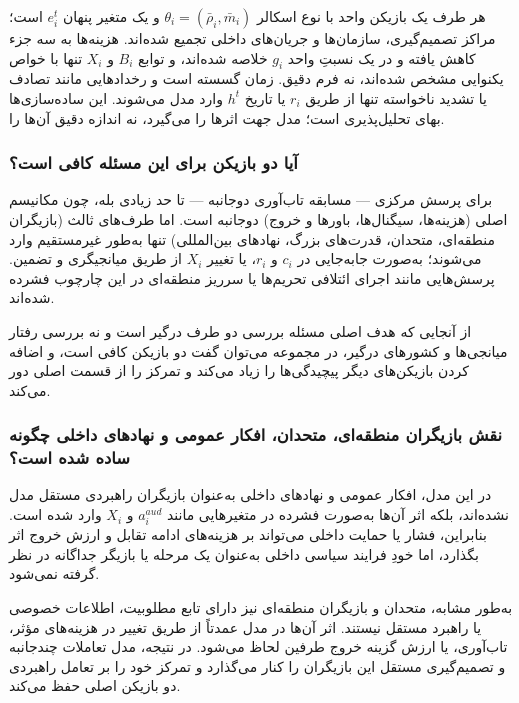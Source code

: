 \documentclass[12pt]{article}
\begin{document}
هر طرف یک بازیکن واحد با نوع اسکالر $\theta_i = (\bar{\rho}_i,\bar{m}_i)$
و یک متغیر پنهان $e_i^t$ است؛ مراکز تصمیم‌گیری، سازمان‌ها و جریان‌های داخلی تجمیع شده‌اند.
هزینه‌ها به سه جزء کاهش یافته و در یک نسبتِ واحد $g_i$ خلاصه شده‌اند،
و توابع $B_i$ و $X_i$ تنها با خواص یکنوایی مشخص شده‌اند، نه فرم دقیق.
زمان گسسته است و رخدادهایی مانند تصادف یا تشدید ناخواسته
تنها از طریق $r_i$ یا تاریخ $h^t$ وارد مدل می‌شوند.
این ساده‌سازی‌ها بهای تحلیل‌پذیری است؛ مدل جهت اثرها را می‌گیرد، نه اندازه دقیق آن‌ها را.

\subsubsection*{آیا دو بازیکن برای این مسئله کافی است؟}

برای پرسش مرکزی — مسابقه تاب‌آوری دوجانبه — تا حد زیادی بله،
چون مکانیسم اصلی (هزینه‌ها، سیگنال‌ها، باورها و خروج) دوجانبه است.
اما طرف‌های ثالث (بازیگران منطقه‌ای، متحدان، قدرت‌های بزرگ، نهادهای بین‌المللی)
تنها به‌طور غیرمستقیم وارد می‌شوند؛ به‌صورت جابه‌جایی در 
$c_i$ و $r_i$،
یا تغییر $X_i$ از طریق میانجیگری و تضمین.
پرسش‌هایی مانند اجرای ائتلافی تحریم‌ها یا سرریز منطقه‌ای
در این چارچوب فشرده شده‌اند. 

از آنجایی که هدف اصلی مسئله بررسی دو طرف درگیر است و نه 
بررسی رفتار میانجی‌ها و کشورهای درگیر، در مجموعه می‌توان گفت دو بازیکن کافی است،
و اضافه کردن بازیکن‌های دیگر پیچیدگی‌ها را زیاد می‌کند و تمرکز را از قسمت اصلی
دور می‌کند.

\subsubsection*{نقش بازیگران منطقه‌ای، متحدان، افکار عمومی و نهادهای داخلی چگونه ساده شده است؟}

در این مدل، افکار عمومی و نهادهای داخلی به‌عنوان بازیگران
 راهبردی مستقل مدل نشده‌اند، بلکه اثر آن‌ها به‌صورت فشرده در متغیرهایی مانند 
 $a_i^{aud}$ و $X_i$
  وارد شده است. بنابراین، فشار یا حمایت
   داخلی می‌تواند بر هزینه‌های ادامه تقابل و ارزش خروج اثر بگذارد، اما خودِ 
  فرایند سیاسی داخلی به‌عنوان یک مرحله یا بازیگر جداگانه در نظر گرفته نمی‌شود.

به‌طور مشابه، متحدان و بازیگران منطقه‌ای نیز
 دارای تابع مطلوبیت، اطلاعات خصوصی یا راهبرد مستقل نیستند. اثر آن‌ها در مدل
 عمدتاً از طریق تغییر در هزینه‌های مؤثر، تاب‌آوری، یا ارزش گزینه خروج طرفین
 لحاظ می‌شود. در نتیجه، مدل تعاملات چندجانبه و تصمیم‌گیری مستقل این بازیگران
 را کنار می‌گذارد و تمرکز خود را بر تعامل راهبردی دو بازیکن اصلی حفظ می‌کند.
\end{document}
